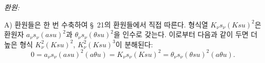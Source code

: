 
\noindent\emph{환원:}

A) 환원들은 한 번 수축하여 \S\ 21의 환원들에서 직접 따른다. 형식열 $K_\nu s_\nu(Ksu)^2$은 환원자 $a_\nu s_\nu(asu)^2$과 $\theta_\nu s_\nu(\theta su)^2$을 인수로 갖는다. 이로부터 다음과 같이 두면 더 높은 형식 $K_\nu^2(Ksu)^2$, $K_\nu^2(Ksu)^3$이 분해된다:
\[
0=a_\nu s_\nu(asu)^2(a\theta u)=K_\nu s_\nu(Ksu)^2=\theta_\nu s_\nu(\theta su)^2(a\theta u).
\]
